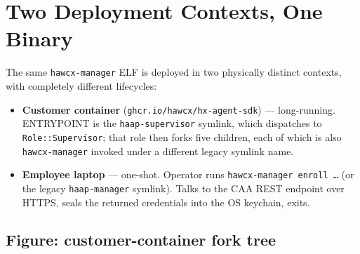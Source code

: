 \documentclass[11pt, a4paper]{article}
\newcommand{\code}[1]{\texttt{\small #1}}
\begin{document}
\clearpage

\section{Two Deployment Contexts, One Binary}\label{sec:contexts}

The same \code{hawcx-manager} ELF is deployed in two physically distinct
contexts, with completely different lifecycles:

\begin{itemize}
  \item \textbf{Customer container} (\code{ghcr.io/hawcx/hx-agent-sdk})
        --- long-running. ENTRYPOINT is the \code{haap-supervisor} symlink,
        which dispatches to \code{Role::Supervisor}; that role then forks
        five children, each of which is also \code{hawcx-manager} invoked
        under a different legacy symlink name.
  \item \textbf{Employee laptop} --- one-shot. Operator runs
        \code{hawcx-manager enroll \dots} (or the legacy \code{haap-manager}
        symlink). Talks to the CAA REST endpoint over HTTPS, seals the
        returned credentials into the OS keychain, exits.
\end{itemize}

\subsection{Figure: customer-container fork tree}
\end{document}
